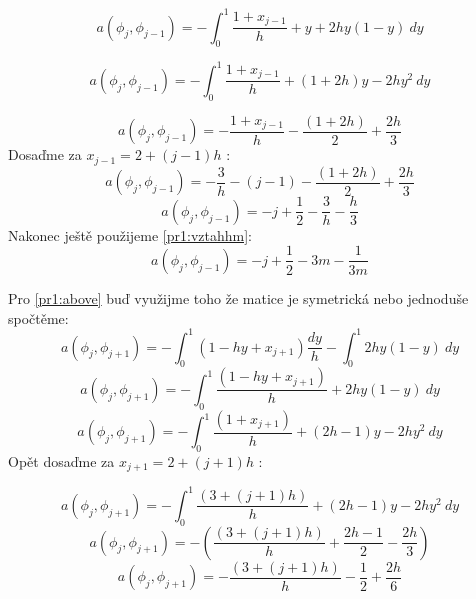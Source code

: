 \documentclass[../main.tex]{subfiles}
\begin{document}
\begin{equation}
    a(\phi_j, \phi_{j-1}) = - \int_0^1 \frac{1+ x_{j-1}}{h} + y  + 2h y(1-y) \ dy
\end{equation}

\begin{equation}
    a(\phi_j, \phi_{j-1}) = - \int_0^1 \frac{1+ x_{j-1}}{h} + (1+2h)y - 2h y^2 \ dy
\end{equation}

\begin{equation}
    a(\phi_j, \phi_{j-1}) = -  \frac{1+ x_{j-1}}{h} - \frac{(1+2h)}{2} + \frac{2h}{3}
\end{equation}
Dosaďme za $x_{j-1} = 2 + (j-1)h$ : 
\begin{equation}
    a(\phi_j, \phi_{j-1}) = -  \frac{3}{h} - (j-1) - \frac{(1+2h)}{2} + \frac{2h}{3}
\end{equation}
\begin{equation}
    a(\phi_j, \phi_{j-1}) = -j + \frac{1}{2} -\frac{3}{h} -\frac{h}{3}
\end{equation}
Nakonec ještě použijeme \eqref{pr1:vztahhm}:
\begin{equation}
    a(\phi_j, \phi_{j-1}) = -j + \frac{1}{2} -3m -\frac{1}{3m}
\end{equation}


Pro \eqref{pr1:above} buď využijme toho že matice je symetrická nebo jednoduše spočtěme:
\begin{equation}
    a(\phi_j, \phi_{j+1}) = - \int_0^1 (1 -hy + x_{j+1}) \frac{dy}{h} - \int_0^1 2h y(1-y) \ dy
\end{equation}
\begin{equation}
    a(\phi_j, \phi_{j+1}) = - \int_0^1 \frac{(1 -hy + x_{j+1}) }{h} + 2h y(1-y) \ dy
\end{equation}
\begin{equation}
    a(\phi_j, \phi_{j+1}) = - \int_0^1 \frac{(1 + x_{j+1}) }{h} +(2h - 1)y - 2hy^2 \ dy
\end{equation}
Opět dosaďme za $x_{j+1} = 2 + (j+1)h$ : 

\begin{equation}
    a(\phi_j, \phi_{j+1}) = - \int_0^1 \frac{(3 + (j+1)h) }{h} + (2h - 1)y - 2hy^2 \ dy
\end{equation}
\begin{equation}
    a(\phi_j, \phi_{j+1}) = - \left( \frac{(3 + (j+1)h) }{h} + \frac{2h - 1}{2} - \frac{2h}{3}\right)
\end{equation}
\begin{equation}
    a(\phi_j, \phi_{j+1}) = - \frac{(3 + (j+1)h) }{h} - \frac{1}{2} + \frac{2h}{6} 
\end{equation}
\end{document}
